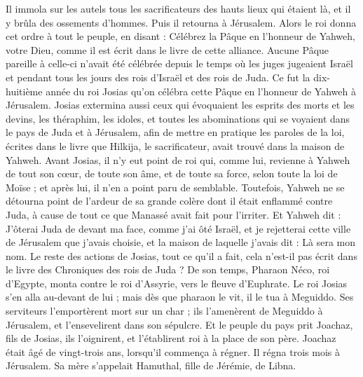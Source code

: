 \begin{multicols}{2}
Il immola sur les autels tous les sacrificateurs des hauts lieux qui étaient là, et il y brûla des ossements d’hommes. Puis il retourna à Jérusalem.
Alors le roi donna cet ordre à tout le peuple, en disant : Célébrez la Pâque en l’honneur de Yahweh, votre Dieu, comme il est écrit dans le livre de cette alliance.
Aucune Pâque pareille à celle-ci n’avait été célébrée depuis le temps où les juges jugeaient Israël et pendant tous les jours des rois d’Israël et des rois de Juda.
Ce fut la dix-huitième année du roi Josias qu’on célébra cette Pâque en l’honneur de Yahweh à Jérusalem.
Josias extermina aussi ceux qui évoquaient les esprits des morts et les devins, les théraphim, les idoles, et toutes les abominations qui se voyaient dans le pays de Juda et à Jérusalem, afin de mettre en pratique les paroles de la loi, écrites dans le livre que Hilkija, le sacrificateur, avait trouvé dans la maison de Yahweh.
Avant Josias, il n’y eut point de roi qui, comme lui, revienne à Yahweh de tout son cœur, de toute son âme, et de toute sa force, selon toute la loi de Moïse ; et après lui, il n’en a point paru de semblable.
Toutefois, Yahweh ne se détourna point de l’ardeur de sa grande colère dont il était enflammé contre Juda, à cause de tout ce que Manassé avait fait pour l’irriter.
Et Yahweh dit : J’ôterai Juda de devant ma face, comme j’ai ôté Israël, et je rejetterai cette ville de Jérusalem que j’avais choisie, et la maison de laquelle j’avais dit : Là sera mon nom.
Le reste des actions de Josias, tout ce qu’il a fait, cela n’est-il pas écrit dans le livre des Chroniques des rois de Juda ?
De son temps, Pharaon Néco, roi d’Egypte, monta contre le roi d’Assyrie, vers le fleuve d’Euphrate. Le roi Josias s’en alla au-devant de lui ; mais dès que pharaon le vit, il le tua à Meguiddo.
Ses serviteurs l’emportèrent mort sur un char ; ils l’amenèrent de Meguiddo à Jérusalem, et l’ensevelirent dans son sépulcre. Et le peuple du pays prit Joachaz, fils de Josias, ils l’oignirent, et l’établirent roi à la place de son père.
Joachaz était âgé de vingt-trois ans, lorsqu’il commença à régner. Il régna trois mois à Jérusalem. Sa mère s’appelait Hamuthal, fille de Jérémie, de Libna.

\end{multicols}
